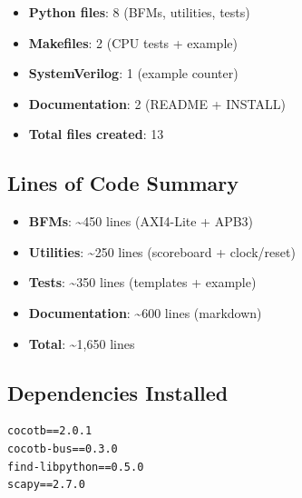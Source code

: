 \begin{record}

\begin{itemize}
\tightlist
\item
  \textbf{Python files}: 8 (BFMs, utilities, tests)
\item
  \textbf{Makefiles}: 2 (CPU tests + example)
\item
  \textbf{SystemVerilog}: 1 (example counter)
\item
  \textbf{Documentation}: 2 (README + INSTALL)
\item
  \textbf{Total files created}: 13
\end{itemize}

\end{record}

\subsection{Lines of Code Summary}\label{cr:app:archive-cocotb-setup-summary:lines-of-code-summary}

\begin{record}

\begin{itemize}
\tightlist
\item
  \textbf{BFMs}: \textasciitilde450 lines (AXI4-Lite + APB3)
\item
  \textbf{Utilities}: \textasciitilde250 lines (scoreboard +
  clock/\allowbreak{}reset)
\item
  \textbf{Tests}: \textasciitilde350 lines (templates + example)
\item
  \textbf{Documentation}: \textasciitilde600 lines (markdown)
\item
  \textbf{Total}: \textasciitilde1,650 lines
\end{itemize}

\end{record}

\subsection{Dependencies Installed}\label{cr:app:archive-cocotb-setup-summary:dependencies-installed}

\begin{record}

\begin{lstlisting}[language={}]
cocotb==2.0.1
cocotb-bus==0.3.0
find-libpython==0.5.0
scapy==2.7.0
\end{lstlisting}

\end{record}

